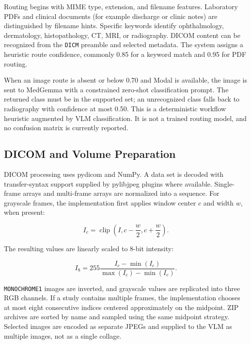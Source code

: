 \documentclass[conference]{IEEEtran}
\begin{document}
Routing begins with MIME type, extension, and filename features. Laboratory PDFs and clinical documents (for example discharge or clinic notes) are distinguished by filename hints. Specific keywords identify ophthalmology, dermatology, histopathology, CT, MRI, or radiography. DICOM content can be recognized from the \texttt{DICM} preamble and selected metadata. The system assigns a heuristic route confidence, commonly 0.85 for a keyword match and 0.95 for PDF routing.

When an image route is absent or below 0.70 and Modal is available, the image is sent to MedGemma with a constrained zero-shot classification prompt. The returned class must be in the supported set; an unrecognized class falls back to radiography with confidence at most 0.50. This is a deterministic workflow heuristic augmented by VLM classification. It is not a trained routing model, and no confusion matrix is currently reported.

\subsection{DICOM and Volume Preparation}

DICOM processing uses pydicom and NumPy. A data set is decoded with transfer-syntax support supplied by pylibjpeg plugins where available. Single-frame arrays and multi-frame arrays are normalized into a sequence. For grayscale frames, the implementation first applies window center \(c\) and width \(w\), when present:

\begin{equation}
  I_c = \operatorname{clip}\left(I, c-\frac{w}{2}, c+\frac{w}{2}\right).
\end{equation}

The resulting values are linearly scaled to 8-bit intensity:

\begin{equation}
  I_8 = 255\frac{I_c-\min(I_c)}{\max(I_c)-\min(I_c)}.
\end{equation}

\texttt{MONOCHROME1} images are inverted, and grayscale values are replicated into three RGB channels. If a study contains multiple frames, the implementation chooses at most eight consecutive indices centered approximately on the midpoint. ZIP archives are sorted by name and sampled using the same midpoint strategy. Selected images are encoded as separate JPEGs and supplied to the VLM as multiple images, not as a single collage.
\end{document}
